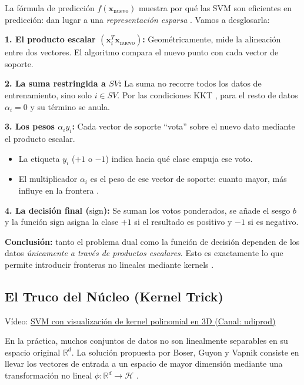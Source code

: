 \documentclass[12pt, a4paper]{article}
\begin{document}
\begin{tcolorbox}[colback=blue!5!white,colframe=blue!75!black,title=\textbf{Nota Aclaratoria: Entendiendo la Función de Decisión}]
La fórmula de predicción $f(\mathbf{x}_{\text{nuevo}})$ muestra por qué las SVM son eficientes en predicción: dan lugar a una \textit{representación esparsa} \cite{hastie2009elements}. Vamos a desglosarla:

\textbf{1. El producto escalar $(\mathbf{x}_i^T \mathbf{x}_{\text{nuevo}})$:}
Geométricamente, mide la alineación entre dos vectores. El algoritmo compara el nuevo punto con cada vector de soporte.

\textbf{2. La suma restringida a $SV$:}
La suma no recorre todos los datos de entrenamiento, sino solo $i \in SV$. Por las condiciones KKT \cite{bishop2006pattern}, para el resto de datos $\alpha_i = 0$ y su término se anula.

\textbf{3. Los pesos $\alpha_i y_i$:}
Cada vector de soporte ``vota'' sobre el nuevo dato mediante el producto escalar.
\begin{itemize}
    \item La etiqueta $y_i$ ($+1$ o $-1$) indica hacia qué clase empuja ese voto.
    \item El multiplicador $\alpha_i$ es el peso de ese vector de soporte: cuanto mayor, más influye en la frontera \cite{cortes1995support}.
\end{itemize}

\textbf{4. La decisión final ($\text{sign}$):}
Se suman los votos ponderados, se añade el sesgo $b$ y la función $\text{sign}$ asigna la clase $+1$ si el resultado es positivo y $-1$ si es negativo.

\textbf{Conclusión:} tanto el problema dual como la función de decisión dependen de los datos \textit{únicamente a través de productos escalares}. Esto es exactamente lo que permite introducir fronteras no lineales mediante kernels \cite{bishop2006pattern}.
\end{tcolorbox}

\subsection{El Truco del Núcleo (Kernel Trick)}
\noindent Vídeo: \href{https://www.youtube.com/watch?v=OdlNM96sHio}{SVM con visualización de kernel polinomial en 3D (Canal: udiprod)}

\vspace{0.5cm}

\noindent En la práctica, muchos conjuntos de datos no son linealmente separables en su espacio original $\mathbb{R}^d$. La solución propuesta por Boser, Guyon y Vapnik consiste en llevar los vectores de entrada a un espacio de mayor dimensión mediante una transformación no lineal $\phi: \mathbb{R}^d \rightarrow \mathcal{H}$ \cite{hastie2009elements}.
\end{document}
